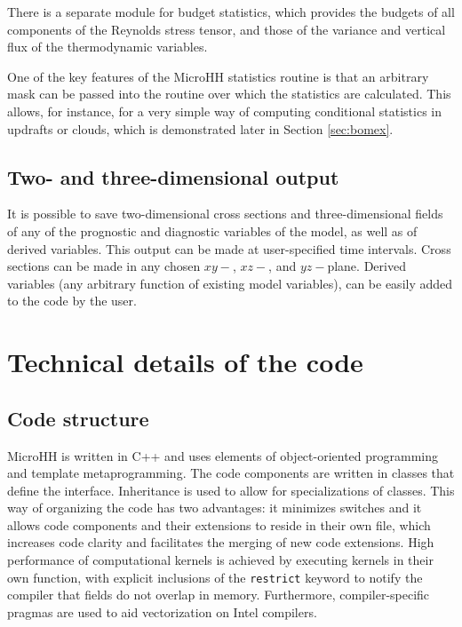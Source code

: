 \documentclass[gmd,manuscript]{copernicus}
\begin{document}
There is a separate module for budget statistics, which provides the budgets of all components of the Reynolds stress tensor, and those of the variance and vertical flux of the thermodynamic variables.

One of the key features of the MicroHH statistics routine is that an arbitrary mask can be passed into the routine over which the statistics are calculated. This allows, for instance, for a very simple way of computing conditional statistics in updrafts or clouds, which is demonstrated later in Section \ref{sec:bomex}.

\subsection{Two- and three-dimensional output}
It is possible to save two-dimensional cross sections and three-dimensional fields of any of the prognostic and diagnostic variables of the model, as well as of derived variables. This output can be made at user-specified time intervals. Cross sections can be made in any chosen $xy-$, $xz-$, and $yz-$plane. Derived variables (any arbitrary function of existing model variables), can be easily added to the code by the user.

\section{Technical details of the code}\label{sec:technical}
\subsection{Code structure}
MicroHH is written in C++ and uses elements of object-oriented programming and template metaprogramming. The code components are written in classes that define the interface. Inheritance is used to allow for specializations of classes. This way of organizing the code has two advantages: it minimizes switches and it allows code components and their extensions to reside in their own file, which increases code clarity and facilitates the merging of new code extensions. High performance of computational kernels is achieved by executing kernels in their own function, with explicit inclusions of the \texttt{restrict} keyword to notify the compiler that fields do not overlap in memory. Furthermore, compiler-specific pragmas are used to aid vectorization on Intel compilers.
\end{document}
